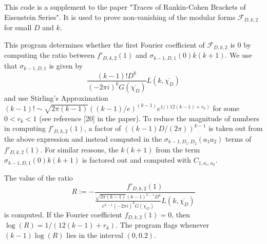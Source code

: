 This code is a supplement to the paper "Traces of Rankin-Cohen Brackets of Eisenstein Series". It is used to prove non-vanishing of the modular forms $\mathcal F_{D, k, 2}$ for small $D$ and $k$. 

This program determines whether the first Fourier coefficient of $\mathcal F_{D, k, 2}$ is $0$ by computing the ratio between $f'_{D, k, 2}(1)$ and $\sigma_{k-1, D, 1}(0) k(k+1)$. We use that $\sigma_{k-1, D, 1}$ is given by 
$$\frac{(k-1)! D^k}{(-2\pi i)^k G(\overline{\chi_D})}L(k, \overline{\chi_D})$$
and use Stirling's Approximation $(k-1)! \sim \sqrt{2\pi(k-1)} ((k-1)/e)^{(k-1)} e^{1/(12(k-1)+r_k)}$ for some $0<r_k<1$ (see reference [20] in the paper). To reduce the magnitude of numbers in computing $f'_{D, k, 2}(1)$, a factor of $((k-1)D/(2\pi))^{k-1}$ is taken out from the above expression and instead computed in the $\sigma_{k-1, D_1, D_2}(a_1a_2)$ terms of $f'_{D, k, 2}(1)$. For similar reasons, the $k(k+1)$ from the term $\sigma_{k-1, D, 1}(0) k(k+1)$ is factored out and computed with $C_{1, a_1, a_2}$. 

The value of the ratio  
$$R := -\frac{f'_{D, k, 2}(1)}{\frac{\sqrt{2\pi (k-1)}(k-1)^{k-1} D^k}{e^{k-1}(-2\pi i)^k G(\overline{\chi_D})}L(k, \overline{\chi_D})}$$
is computed. If the Fourier coefficient $f_{D, k, 2}(1) = 0$, then $\log(R) = 1/(12(k-1)+r_k)$. The program flags whenever $(k-1)\log(R)$ lies in the interval $(0,0.2)$. 
